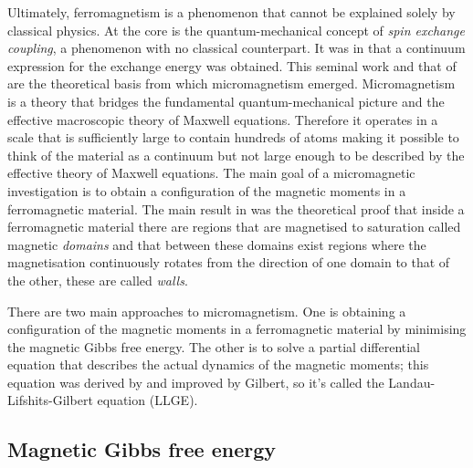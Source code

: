 Ultimately, ferromagnetism is a phenomenon that cannot be explained solely by classical physics. At the core is the quantum-mechanical concept of \textit{spin exchange coupling}, a phenomenon with no classical counterpart. It was in \citet{Landau} that a continuum expression for the exchange energy was obtained. This seminal work and that of \citet{Brown} are the theoretical basis from which micromagnetism emerged. Micromagnetism is a theory that bridges the fundamental quantum-mechanical picture and the effective macroscopic theory of Maxwell equations. Therefore it operates in a scale that is sufficiently large to contain hundreds of atoms making it possible to think of the material as a continuum but not large enough to be described by the effective theory of Maxwell equations. The main goal of a micromagnetic investigation is to obtain a configuration of the magnetic moments in a ferromagnetic material. The main result in \citet{Landau} was the theoretical proof that inside a ferromagnetic material there are regions that are magnetised to saturation called magnetic \textit{domains} and that between these domains exist regions where the magnetisation continuously rotates from the direction of one domain to that of the other, these are called \textit{walls}.\par

There are two main approaches to micromagnetism. One is obtaining a configuration of the magnetic moments in a ferromagnetic material by minimising the magnetic Gibbs free energy. The other is to solve a partial differential equation that describes the actual dynamics of the magnetic moments; this equation was derived by \citet{Landau} and improved by Gilbert, so it's called the Landau-Lifshits-Gilbert equation (LLGE).\par

\subsection{Magnetic Gibbs free energy}

